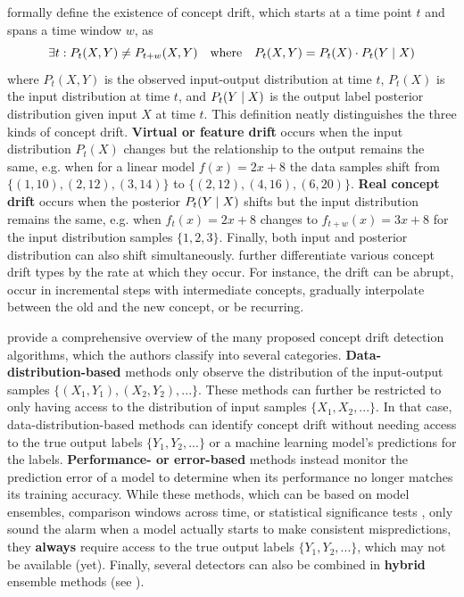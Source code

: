 \newpar \textcite{concept-drift-definition-2019} formally define the existence of concept drift, which starts at a time point $t$ and spans a time window $w$, as
\begin{equation*}
    \exists t \mathrel{:} P_t(X, Y) \neq P_{t+w}(X, Y) \quad \text{where} \quad P_t(X, Y) = P_t(X) \cdot P_t(Y \mathrel{|} X)
\end{equation*}
where $P_t(X, Y)$ is the observed input-output distribution at time $t$, $P_t(X)$ is the input distribution at time $t$, and $P_t(Y \mathrel{|} X)$ is the output label posterior distribution given input $X$ at time $t$. This definition neatly distinguishes the three kinds of concept drift. \textbf{Virtual or feature drift} occurs when the input distribution $P_t(X)$ changes but the relationship to the output remains the same, e.g. when for a linear model $f(x) = 2x + 8$ the data samples shift from $\{ (1, 10), (2, 12), (3, 14) \}$ to $\{ (2, 12), (4, 16), (6, 20) \}$. \textbf{Real concept drift} occurs when the posterior $P_t(Y \mathrel{|} X)$ shifts but the input distribution remains the same, e.g. when $f_t(x) = 2x + 8$ changes to $f_{t+w}(x) = 3x + 8$ for the input distribution samples $\{ 1, 2, 3 \}$. Finally, both input and posterior distribution can also shift simultaneously. \textcite{concept-drift-rates-2014} further differentiate various concept drift types by the rate at which they occur. For instance, the drift can be abrupt, occur in incremental steps with intermediate concepts, gradually interpolate between the old and the new concept, or be recurring.

\newpar \textcite{concept-drift-detectors-2022} provide a comprehensive overview of the many proposed concept drift detection algorithms, which the authors classify into several categories. \textbf{Data-distribution-based} methods only observe the distribution of the input-output samples $\{(X_1, Y_1), (X_2, Y_2), ...\}$. These methods can further be restricted to only having access to the distribution of input samples $\{X_1, X_2, ...\}$. In that case, data-distribution-based methods can identify concept drift without needing access to the true output labels $\{Y_1, Y_2, ...\}$ or a machine learning model's predictions for the labels. \textbf{Performance- or error-based} methods instead monitor the prediction error of a model to determine when its performance no longer matches its training accuracy. While these methods, which can be based on model ensembles, comparison windows across time, or statistical significance tests \cite{concept-drift-detectors-2022}, only sound the alarm when a model actually starts to make consistent mispredictions, they \textbf{always} require access to the true output labels $\{Y_1, Y_2, ...\}$, which may not be available (yet). Finally, several detectors can also be combined in \textbf{hybrid} ensemble methods (see ).

